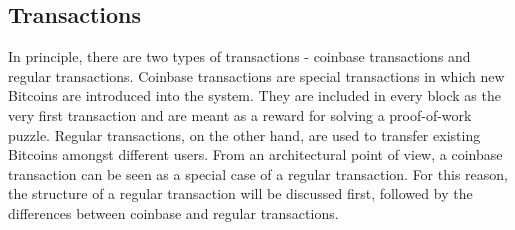 \clearpage
\subsection{Transactions} \label{sec:Transactions}
In principle, there are two types of transactions - coinbase transactions and regular transactions. Coinbase transactions are special transactions in which new Bitcoins are introduced into the system. They are included in every block as the very first transaction and are meant as a reward for solving a proof-of-work puzzle. Regular transactions, on the other hand, are used to transfer existing Bitcoins amongst different users. From an architectural point of view, a coinbase transaction can be seen as a special case of a regular transaction. For this reason, the structure of a regular transaction will be discussed first, followed by the differences between coinbase and regular transactions.

\enlargethispage{2\baselineskip}
